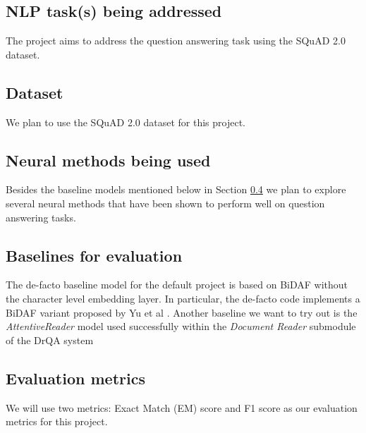 \subsection{NLP task(s) being addressed}
\label{subsec:projecttasks}

The project aims to address the question answering task using the SQuAD 2.0 dataset.

\subsection{Dataset}
\label{subsec:projectdataset}

We plan to use the SQuAD 2.0 dataset for this project.

\subsection{Neural methods being used}
\label{subsec:projectmethods}

Besides the baseline models mentioned below in Section \ref{subsec:projectbaselines} we plan to explore several neural methods that have been shown to perform well on question answering tasks.


\subsection{Baselines for evaluation}
\label{subsec:projectbaselines}

The de-facto baseline model for the default project is based on BiDAF \cite{seo2016bidirectional} without the character level embedding layer. In particular, the de-facto code implements a BiDAF variant proposed by Yu et al \cite{yu2018qanet}.  Another baseline we want to try out is the \textit{AttentiveReader} model \cite{hermann2015teaching} used successfully within the \textit{Document Reader} submodule of the DrQA system \cite{chen2017reading}

\subsection{Evaluation metrics}
\label{subsec:projectmetrics}

We will use two metrics: Exact Match (EM) score and F1 score as our evaluation metrics for this project.
